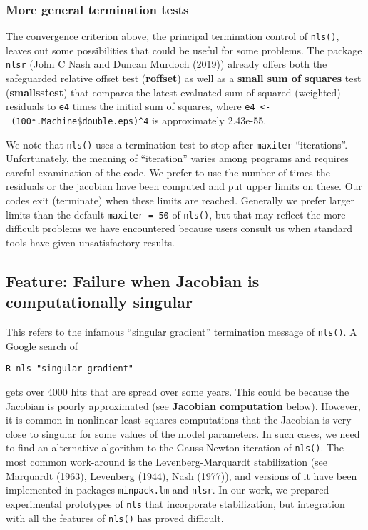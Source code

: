 \documentclass[
]{article}
\begin{document}
\hypertarget{more-general-termination-tests}{%
\subsubsection{More general termination
tests}\label{more-general-termination-tests}}

The convergence criterion above, the principal termination control of
\texttt{nls()}, leaves out some possibilities that could be useful for
some problems. The package \texttt{nlsr} (John C Nash and Duncan Murdoch
(\protect\hyperlink{ref-nlsr-manual}{2019})) already offers both the
safeguarded relative offset test (\textbf{roffset}) as well as a
\textbf{small sum of squares} test (\textbf{smallsstest}) that compares
the latest evaluated sum of squared (weighted) residuals to \texttt{e4}
times the initial sum of squares, where
\texttt{e4\ \textless{}-\ (100*.Machine\$double.eps)\^{}4} is
approximately 2.43e-55.

We note that \texttt{nls()} uses a termination test to stop after
\texttt{maxiter} ``iterations''. Unfortunately, the meaning of
``iteration'' varies among programs and requires careful examination of
the code. We prefer to use the number of times the residuals or the
jacobian have been computed and put upper limits on these. Our codes
exit (terminate) when these limits are reached. Generally we prefer
larger limits than the default \texttt{maxiter\ =\ 50} of
\texttt{nls()}, but that may reflect the more difficult problems we have
encountered because users consult us when standard tools have given
unsatisfactory results.

\hypertarget{feature-failure-when-jacobian-is-computationally-singular}{%
\subsection{Feature: Failure when Jacobian is computationally
singular}\label{feature-failure-when-jacobian-is-computationally-singular}}

This refers to the infamous ``singular gradient'' termination message of
\texttt{nls()}. A Google search of

\begin{verbatim}
R nls "singular gradient"
\end{verbatim}

gets over 4000 hits that are spread over some years. This could be
because the Jacobian is poorly approximated (see \textbf{Jacobian
computation} below). However, it is common in nonlinear least squares
computations that the Jacobian is very close to singular for some values
of the model parameters. In such cases, we need to find an alternative
algorithm to the Gauss-Newton iteration of \texttt{nls()}. The most
common work-around is the Levenberg-Marquardt stabilization (see
Marquardt (\protect\hyperlink{ref-Marquardt1963}{1963}), Levenberg
(\protect\hyperlink{ref-Levenberg1944}{1944}), Nash
(\protect\hyperlink{ref-jn77ima}{1977})), and versions of it have been
implemented in packages \texttt{minpack.lm} and \texttt{nlsr}. In our
work, we prepared experimental prototypes of \texttt{nls} that
incorporate stabilization, but integration with all the features of
\texttt{nls()} has proved difficult.
\end{document}
